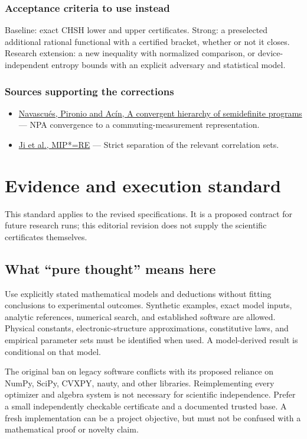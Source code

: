 \documentclass[
  11pt,
]{article}
\begin{document}
\subsubsection{Acceptance criteria to use instead}

Baseline: exact CHSH lower and upper certificates. Strong: a preselected
additional rational functional with a certified bracket, whether or not
it closes. Research extension: a new inequality with normalized
comparison, or device-independent entropy bounds with an explicit
adversary and statistical model.

\subsubsection{Sources supporting the corrections}

\begin{itemize}
\item
  \href{https://arxiv.org/abs/0803.4290}{Navascués, Pironio and Acín, A
  convergent hierarchy of semidefinite programs} --- NPA convergence to
  a commuting-measurement representation.
\item
  \href{https://arxiv.org/abs/2001.04383}{Ji et al., MIP*=RE} --- Strict
  separation of the relevant correlation sets.
\end{itemize}

\section{Evidence and execution standard}

This standard applies to the revised specifications. It is a proposed
contract for future research runs; this editorial revision does not
supply the scientific certificates themselves.

\subsection{What ``pure thought'' means here}

Use explicitly stated mathematical models and deductions without fitting
conclusions to experimental outcomes. Synthetic examples, exact model
inputs, analytic references, numerical search, and established software
are allowed. Physical constants, electronic-structure approximations,
constitutive laws, and empirical parameter sets must be identified when
used. A model-derived result is conditional on that model.

The original ban on legacy software conflicts with its proposed reliance
on NumPy, SciPy, CVXPY, nauty, and other libraries. Reimplementing every
optimizer and algebra system is not necessary for scientific
independence. Prefer a small independently checkable certificate and a
documented trusted base. A fresh implementation can be a project
objective, but must not be confused with a mathematical proof or novelty
claim.
\end{document}
